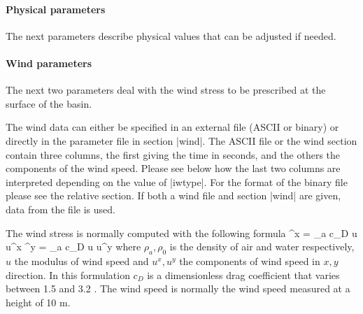 \paragraph{Physical parameters}

The next parameters describe physical values that can be adjusted
if needed.

\par
{}
\par
{}
\par

\paragraph{Wind parameters}

The next two parameters deal with the wind stress to be
prescribed at the surface of the basin.

The wind data can either be specified in an external file (ASCII
or binary) or directly in the parameter file in section |wind|.
The ASCII file or the wind section contain three columns, the first
giving the time in seconds, and the others the components of
the wind speed. Please see below how the last two columns are
interpreted depending on the value of |iwtype|. For the format
of the binary file please see the relative section.
If both a wind file and section |wind| are given, data from the
file is used.

The wind stress is normally computed with the following formula
\beq
\tau^x = \rho_a c_D \vert u \vert u^x \quad
\tau^y = \rho_a c_D \vert u \vert u^y
\eeq
where $\rho_a,\rho_0$ is the density of air and water respectively,
$u$ the modulus of wind speed and $u^x,u^y$ the components of
wind speed in $x,y$ direction. In this formulation $c_D$ is a
dimensionless drag coefficient that varies between 1.5  and
3.2 . The wind speed is normally the wind speed measured
at a height of 10 m.


